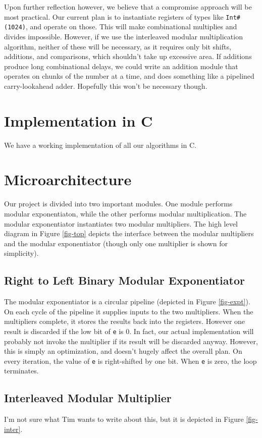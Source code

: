 \documentclass[12pt]{article}
\begin{document}
Upon further reflection however, we believe that a compromise approach will be most practical.
Our current plan is to instantiate registers of types like {\tt Int\#(1024)}, and operate on those.
This will make combinational multiplies and divides impossible.
However, if we use the interleaved modular multiplication algorithm,
neither of these will be necessary, as it requires only bit shifts, additions, and comparisons,
which shouldn't take up excessive area.
If additions produce long combinational delays,
we could write an addition module that operates on chunks of the number at a time,
and does something like a pipelined carry-lookahead adder.
Hopefully this won't be necessary though.

\section{Implementation in C}
We have a working implementation of all our algorithms in C.

\section{Microarchitecture}
Our project is divided into two important modules.
One module performs modular exponentiaton,
while the other performs modular multiplication.
The modular exponentiator instantiates two modular multipliers.
The high level diagram in Figure \ref{fig-top} depicts the interface between
the modular multipliers and the modular exponentiator
(though only one multiplier is shown for simplicity).

\subsection{Right to Left Binary Modular Exponentiator}
The modular exponentiator is a circular pipeline (depicted in Figure \ref{fig-expt}).
On each cycle of the pipeline it supplies inputs to the two multipliers.
When the multipliers complete, it stores the results back into the registers.
However one result is discarded if the low bit of {\tt e} is 0.
In fact, our actual implementation will probably not invoke the multiplier
if its result will be discarded anyway.
However, this is simply an optimization, and doesn't hugely affect the overall plan.
On every iteration, the value of {\tt e} is right-shifted by one bit.
When {\tt e} is zero, the loop terminates.

\subsection{Interleaved Modular Multiplier}
I'm not sure what Tim wants to write about this, but it is depicted in Figure \ref{fig-inter}.
\end{document}
